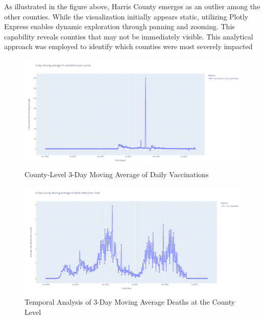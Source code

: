 \documentclass[sigconf,screen,nonacm]{acmart}
\begin{document}
As illustrated in the figure above, Harris County emerges as an outlier among the other counties. While the visualization initially appears static, utilizing Plotly Express enables dynamic exploration through panning and zooming. This capability reveals counties that may not be immediately visible. This analytical approach was employed to identify which counties were most severely impacted
\begin{figure}[H]
  \centering
  \includegraphics[width=\linewidth]{Figures/3daymovingaveragevacines.png}
  \caption{County-Level 3-Day Moving Average of Daily Vaccinations}
  \label{fig:3day_moving_average_vaccines}
\end{figure}

\begin{figure}[H]
  \centering
  \includegraphics[width=\linewidth]{Figures/Temporal3daymovingaverageDeaths.png}
  \caption{Temporal Analysis of 3-Day Moving Average Deaths at the County Level}
  \label{fig:temporal_3day_moving_average_deaths}
\end{figure}
\end{document}
